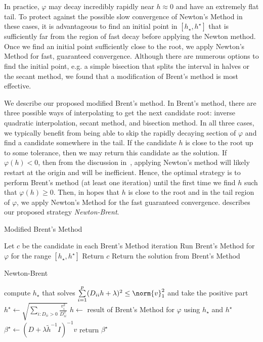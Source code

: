 In practice, $\varphi$ may decay incredibly rapidly near $h \approx 0$ and have an extremely flat tail.
To protect against the possible slow convergence of Newton's Method in these cases,
it is advantageous to find an initial point in $[h_\star, h^\star]$ that is sufficiently 
far from the region of fast decay before applying the Newton method.
Once we find an initial point sufficiently close to the root, 
we apply Newton's Method for fast, guaranteed convergence.
Although there are numerous options to find the initial point,
e.g. a simple bisection that splits the interval in halves or the secant method,
we found that a modification of Brent's method is most effective.

We describe our proposed modified Brent's method.
In Brent's method, there are three possible ways of interpolating to get the next candidate root:
inverse quadratic interpolation, secant method, and bisection method.
In all three cases, we typically benefit from being able to skip the rapidly decaying section of $\varphi$
and find a candidate somewhere in the tail.
If the candidate $h$ is close to the root up to some tolerance, then we may return this candidate as the solution.
If $\varphi(h) < 0$, then from the discussion in~,
applying Newton's method will likely restart at the origin and will be inefficient.
Hence, the optimal strategy is to perform Brent's method (at least one iteration) until
the first time we find $h$ such that $\varphi(h) \geq 0$.
Then, in hopes that $h$ is close to the root and in the tail region of $\varphi$,
we apply Newton's Method for the fast guaranteed convergence.
describes our proposed strategy \emph{Newton-Brent}.

\begin{algorithm}
    \caption{Modified Brent's Method}\label{alg:newton:modified-brent}
    Let $c$ be the candidate in each Brent's Method iteration\;
    Run Brent's Method for $\varphi$ for the range $[h_\star, h^\star]$\;
     {
        Return $c$\;
    }{
        Return the solution from Brent's Method\;
    }
\end{algorithm}

\begin{algorithm}
    \caption{Newton-Brent}\label{alg:newton:newton-brent}
    compute $h_\star$ that solves
    $
        \sum\limits_{i=1}^p
        (D_{ii} h + \lambda)^2
        \leq
        \norm{v}_1^2
    $ and take the positive part\;
    $
        h^\star
        \gets
        \sqrt{
            \sum\limits_{i: D_{ii} > 0} \frac{v_i^2}{D_{ii}^2}
        }
    $\;
    $h\gets $ result of Brent's Method for $\varphi$ using $h_\star$ and $h^\star$\;
    $\beta^\star \gets (D + \lambda \tilde{h}^{-1} I)^{-1} v$\;
    return $\beta^\star$\;
\end{algorithm}

